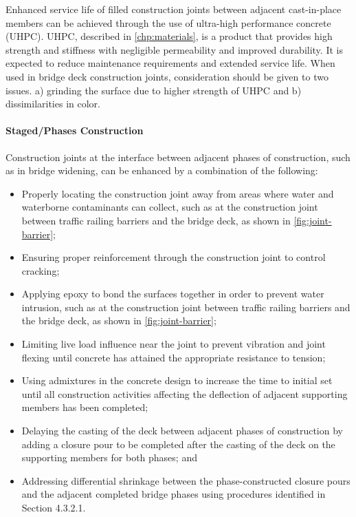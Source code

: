 Enhanced service life of filled construction joints between adjacent cast-in-place members can be achieved
through the use of ultra-high performance concrete (UHPC). UHPC, described in \cref{chp:materials}, is a product that
provides high strength and stiffness with negligible permeability and improved durability. It is expected to reduce
maintenance requirements and extended service life. When used in bridge deck construction joints, consideration
should be given to two issues. a) grinding the surface due to higher strength of UHPC and b) dissimilarities in color.

\paragraph{Staged/Phases Construction}
Construction joints at the interface between adjacent phases of construction, such as in bridge widening, can be
enhanced by a combination of the following:
\begin{itemize}
  \item Properly locating the construction joint away from areas where water and waterborne contaminants can collect, such as at the construction joint between traffic railing barriers and the bridge deck, as shown in \cref{fig:joint-barrier};
  \item Ensuring proper reinforcement through the construction joint to control cracking;
  \item Applying epoxy to bond the surfaces together in order to prevent water intrusion, such as at the construction joint between traffic railing barriers and the bridge deck, as shown in \cref{fig:joint-barrier};
  \item Limiting live load influence near the joint to prevent vibration and joint flexing until concrete has attained the appropriate resistance to tension;
  \item Using admixtures in the concrete design to increase the time to initial set until all construction activities affecting the deflection of adjacent supporting members has been completed;
  \item Delaying the casting of the deck between adjacent phases of construction by adding a closure pour to be completed after the casting of the deck on the supporting members for both phases; and
  \item Addressing differential shrinkage between the phase-constructed closure pours and the adjacent completed bridge phases using procedures identified in Section 4.3.2.1.
\end{itemize}


